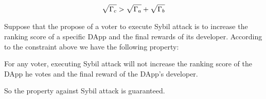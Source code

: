 \begin{align}
	\label{eq:sqrt_nr}
	\sqrt{\Gamma_{c}}>\sqrt{\Gamma_a}+\sqrt{\Gamma_b}
\end{align}

Suppose that the propose of a voter to execute Sybil attack is to increase the ranking score of a specific DApp and the final rewards of its developer. According to the constraint above we have the following property:


\begin{property}
	\label{p3}
    For any voter, executing Sybil attack will not increase the ranking score of the DApp he votes and the final reward of the DApp's developer.
\end{property}
So the property against Sybil attack is guaranteed.
